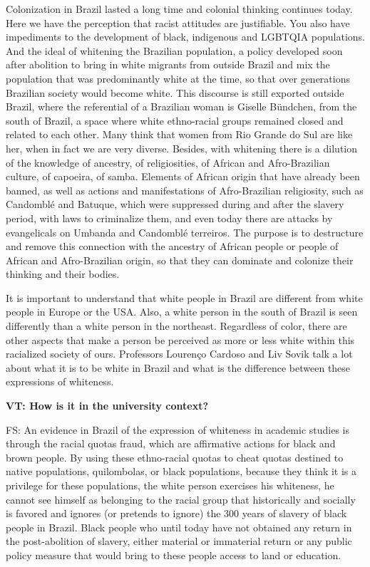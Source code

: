 \documentclass[a4paper,
fontsize=11pt,
oneside,
numbers=noperiodatend,
parskip=half-,
bibliography=totoc,
final
]{scrartcl}
\begin{document}
Colonization in Brazil lasted a long time and colonial thinking
continues today. Here we have the perception that racist attitudes are
justifiable. You also have impediments to the development of black,
indigenous and LGBTQIA populations. And the ideal of whitening the
Brazilian population, a policy developed soon after abolition to bring
in white migrants from outside Brazil and mix the population that was
predominantly white at the time, so that over generations Brazilian
society would become white. This discourse is still exported outside
Brazil, where the referential of a Brazilian woman is Giselle Bündchen,
from the south of Brazil, a space where white ethno-racial groups
remained closed and related to each other. Many think that women from
Rio Grande do Sul are like her, when in fact we are very diverse.
Besides, with whitening there is a dilution of the knowledge of
ancestry, of religiosities, of African and Afro-Brazilian culture, of
capoeira, of samba. Elements of African origin that have already been
banned, as well as actions and manifestations of Afro-Brazilian
religiosity, such as Candomblé and Batuque, which were suppressed during
and after the slavery period, with laws to criminalize them, and even
today there are attacks by evangelicals on Umbanda and Candomblé
terreiros. The purpose is to destructure and remove this connection with
the ancestry of African people or people of African and Afro-Brazilian
origin, so that they can dominate and colonize their thinking and their
bodies.

It is important to understand that white people in Brazil are different
from white people in Europe or the USA. Also, a white person in the
south of Brazil is seen differently than a white person in the
northeast. Regardless of color, there are other aspects that make a
person be perceived as more or less white within this racialized society
of ours. Professors Lourenço Cardoso and Liv Sovik talk a lot about what
it is to be white in Brazil and what is the difference between these
expressions of whiteness.

\textbf{VT: How is it in the university context?}

FS: An evidence in Brazil of the expression of whiteness in academic
studies is through the racial quotas fraud, which are affirmative
actions for black and brown people. By using these ethno-racial quotas
to cheat quotas destined to native populations, quilombolas, or black
populations, because they think it is a privilege for these populations,
the white person exercises his whiteness, he cannot see himself as
belonging to the racial group that historically and socially is favored
and ignores (or pretends to ignore) the 300 years of slavery of black
people in Brazil. Black people who until today have not obtained any
return in the post-abolition of slavery, either material or immaterial
return or any public policy measure that would bring to these people
access to land or education.
\end{document}
